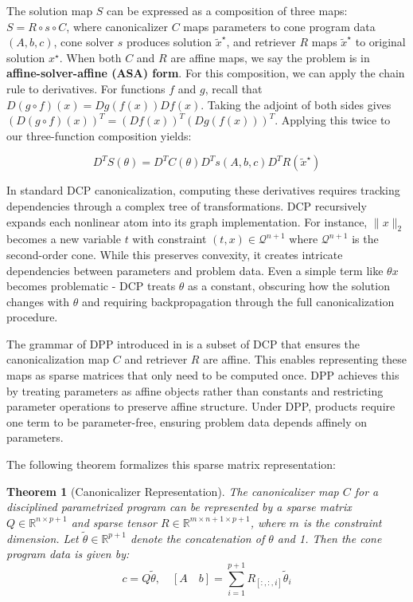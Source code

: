 \documentclass{article}
\newtheorem{theorem}{Theorem}
\begin{document}
The solution map $S$ can be expressed as a composition of three maps: $S = R \circ s \circ C$, where canonicalizer $C$ maps parameters to cone program data $(A, b, c)$, cone solver $s$ produces solution $\tilde{x}^\star$, and retriever $R$ maps $\tilde{x}^\star$ to original solution $x^\star$. When both $C$ and $R$ are affine maps, we say the problem is in \textbf{affine-solver-affine (ASA) form}. For this composition, we can apply the chain rule to derivatives. For functions $f$ and $g$, recall that $D(g \circ f)(x) = Dg(f(x))Df(x)$. Taking the adjoint of both sides gives $(D(g \circ f)(x))^T = (Df(x))^T(Dg(f(x)))^T$. Applying this twice to our three-function composition yields:

\[
D^T S(\theta) = D^T C(\theta)D^T s(A, b, c)D^T R(\tilde{x}^\star)
\]

In standard DCP canonicalization, computing these derivatives requires tracking dependencies through a complex tree of transformations. DCP recursively expands each nonlinear atom into its graph implementation. For instance, $\|x\|_2$ becomes a new variable $t$ with constraint $(t,x) \in \mathcal{Q}^{n+1}$ where $\mathcal{Q}^{n+1}$ is the second-order cone. While this preserves convexity, it creates intricate dependencies between parameters and problem data. Even a simple term like $\theta x$ becomes problematic - DCP treats $\theta$ as a constant, obscuring how the solution changes with $\theta$ and requiring backpropagation through the full canonicalization procedure.


The grammar of DPP introduced in \citet{differentiableconvexoptimizationlayers} is a subset of DCP that ensures the canonicalization map $C$ and retriever $R$ are affine. This enables representing these maps as sparse matrices that only need to be computed once. DPP achieves this by treating parameters as affine objects rather than constants and restricting parameter operations to preserve affine structure. Under DPP, products require one term to be parameter-free, ensuring problem data depends affinely on parameters.

The following theorem formalizes this sparse matrix representation:

\begin{theorem}[Canonicalizer Representation]
The canonicalizer map $C$ for a disciplined parametrized program can be represented by a sparse matrix $Q \in \mathbb{R}^{n \times p+1}$ and sparse tensor $R \in \mathbb{R}^{m \times n+1 \times p+1}$, where $m$ is the constraint dimension. Let $\tilde{\theta} \in \mathbb{R}^{p+1}$ denote the concatenation of $\theta$ and 1. Then the cone program data is given by:
\[
c = Q\tilde{\theta}, \quad [A \quad b] = \sum_{i=1}^{p+1} R_{[:,:,i]}\tilde{\theta}_i
\]
\end{theorem}
\end{document}
